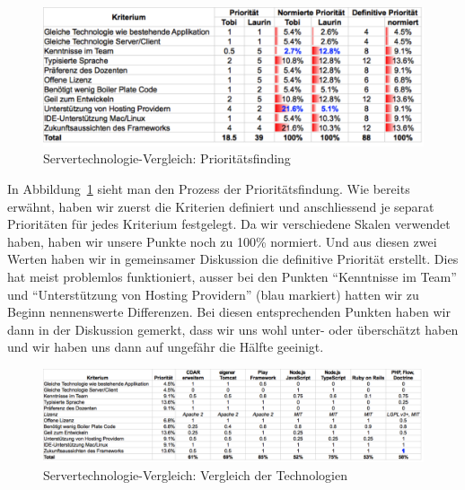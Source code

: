 			\begin{figure}[H]
				\begin{minipage}[b]{\linewidth}
					\includegraphics[width=\textwidth]{media/spreadsheets/ServertechnologieVergleichPrioritaetsfinding.pdf}
					\centering
					\caption{Servertechnologie-Vergleich: Prioritätsfinding}
					\label{fig:ServertechnologieVergleichPrioritaetsfinding}
				\end{minipage}
			\end{figure}
			
			In Abbildung~\ref{fig:ServertechnologieVergleichPrioritaetsfinding} sieht man den Prozess der Prioritätsfindung.
			Wie bereits erwähnt, haben wir zuerst die Kriterien definiert und anschliessend je separat Prioritäten für jedes Kriterium festgelegt.
			Da wir verschiedene Skalen verwendet haben, haben wir unsere Punkte noch zu 100\% normiert.
			Und aus diesen zwei Werten haben wir in gemeinsamer Diskussion die definitive Priorität erstellt.
			Dies hat meist problemlos funktioniert, ausser bei den Punkten "`Kenntnisse im Team"' und "`Unterstützung von Hosting Providern"' (blau markiert) hatten wir zu Beginn nennenswerte Differenzen.
			Bei diesen entsprechenden Punkten haben wir dann in der Diskussion gemerkt, dass wir uns wohl unter- oder überschätzt haben und wir haben uns dann auf ungefähr die Hälfte geeinigt.
		
			\begin{figure}[H]
				\begin{minipage}[b]{\linewidth}
					\includegraphics[width=\textwidth]{media/spreadsheets/ServertechnologieVergleichVergleichDerTechnologien.pdf}
					\centering
					\caption{Servertechnologie-Vergleich: Vergleich der Technologien}
					\label{fig:ServertechnologieVergleichVergleichDerTechnologien.pdf}
				\end{minipage}
			\end{figure}
			
